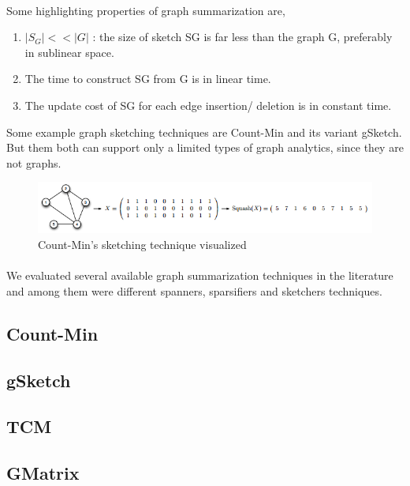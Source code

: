 \documentclass[12pt]{report}
\numberwithin{figure}{section}
\numberwithin{table}{section}
\begin{document}
\paragraph{}
Some highlighting properties of graph summarization are, 

\begin{enumerate}

\item $ | S_G | << | G |$ : the size of sketch SG is far less than the graph G, preferably in sublinear space.
\item The time to construct SG from G is in linear time.
\item The update cost of SG for each edge insertion/ deletion is in constant time.

\end{enumerate}

Some example graph sketching techniques are Count-Min and its variant gSketch. But them both can support only a limited types of graph analytics, since they are not graphs.

\begin{figure}[H]
\centering
\includegraphics[scale=0.6]{images/image15}
\caption{Count-Min's sketching technique visualized}
\end{figure}


\paragraph{}

We evaluated several available graph summarization techniques in the literature and among them were different spanners, sparsifiers and sketchers techniques.  

\subsection{Count-Min}
\subsection{gSketch}
\subsection{TCM}
\subsection{GMatrix}
\end{document}
